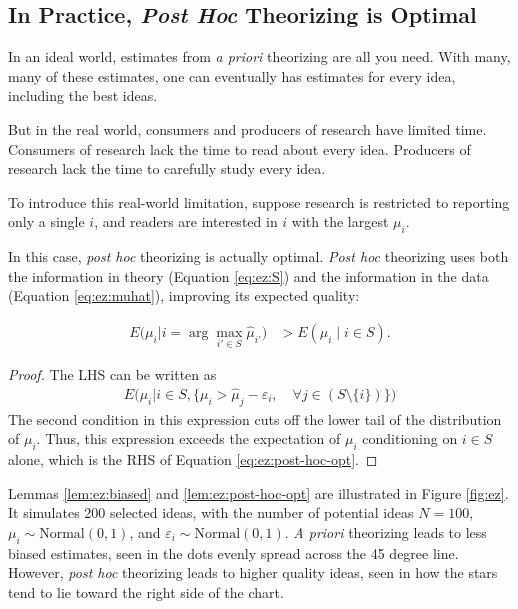 \documentclass[12pt,english]{article}
\theoremstyle{plain}
\theoremstyle{plain}
\begin{document}
\subsection{In Practice, \emph{Post Hoc} Theorizing is Optimal}\label{sec:ez:practical}

In an ideal world, estimates from \emph{a priori} theorizing are all you need. With many, many of these estimates, one can eventually has estimates for every idea, including the best ideas.

But in the real world, consumers and producers of research have limited time. Consumers of research lack the time to read about every idea. Producers of research lack the time to carefully study every idea.

To introduce this real-world limitation, suppose research is restricted to reporting only a single $i$, and readers are interested in $i$ with the largest $\mu_{i}$. 

In this case, \emph{post hoc} theorizing is actually optimal. \emph{Post hoc} theorizing uses both the information in theory (Equation \eqref{eq:ez:S}) and the information in the data (Equation \eqref{eq:ez:muhat}), improving its expected quality:
\begin{lemma}\label{lem:ez:post-hoc-opt}
    \begin{align}
        E\bigg(\mu_{i}\big|i=\arg\max_{i'\in S }\hat{\mu}_{i'}\bigg) & >E\left(\mu_{i}\mid i\in S \right).
        \label{eq:ez:post-hoc-opt}
    \end{align}            
\end{lemma} 
\begin{proof}
    The LHS can be written as 
    \begin{align*}
        E\bigg(\mu_i
        \big|
        i \in S,
        \{
         \mu_i 
        > \hat{\mu}_j - \varepsilon_i
        , \quad
         \forall j \in \left( S\setminus\{i\}
         \right)
         \}
         \bigg)
    \end{align*}
The second condition in this expression cuts off the lower tail of the distribution of $\mu_i$. Thus, this expression exceeds the expectation of $\mu_i$ conditioning on $i\in S$ alone, which is the RHS of Equation \eqref{eq:ez:post-hoc-opt}.
\end{proof}

Lemmas \ref{lem:ez:biased} and \ref{lem:ez:post-hoc-opt} are illustrated in Figure \ref{fig:ez}. It simulates 200 selected ideas, with the number of potential ideas $N=100$, $\mu_i \sim \text{Normal}\left(0, 1\right)$, and $\varepsilon_i \sim \text{Normal}\left(0, 1\right)$. \emph{A priori} theorizing leads to less biased estimates, seen in the dots evenly spread across the 45 degree line. However, \emph{post hoc} theorizing leads to higher quality ideas, seen  in how the stars tend to lie toward the right side of the chart.
\end{document}
